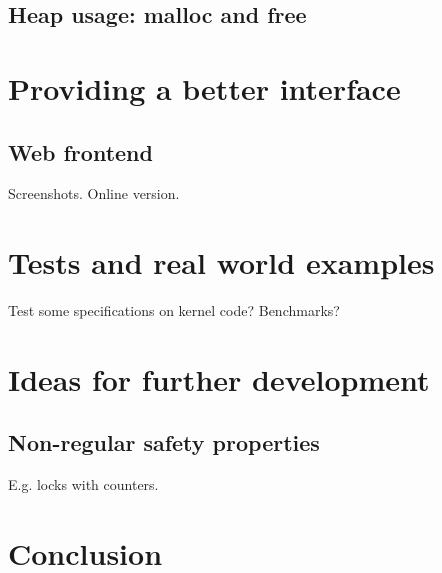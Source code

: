 \section{Heap usage: malloc and free}


\chapter{Providing a better interface}
\section{Web frontend}
Screenshots.
Online version.


\chapter{Tests and real world examples}
Test some specifications on kernel code?
Benchmarks?


\chapter{Ideas for further development}
\section{Non-regular safety properties}
E.g. locks with counters.


\chapter{Conclusion}

